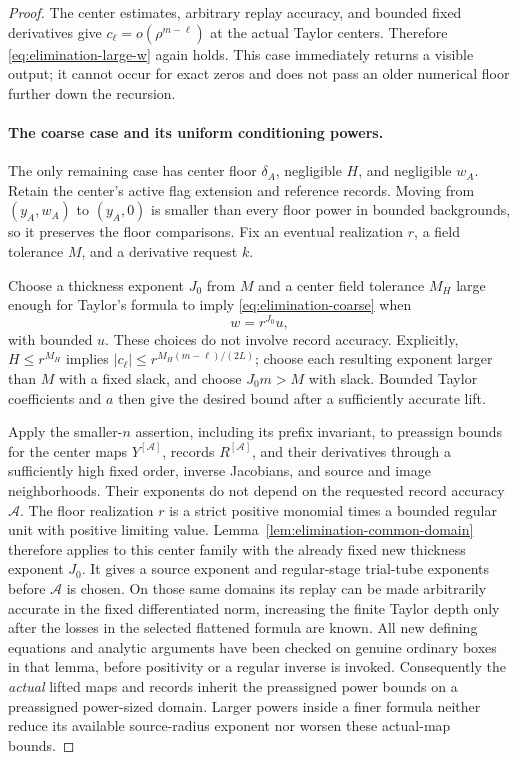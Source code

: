 \begin{proof}
The center estimates, arbitrary replay accuracy, and bounded fixed
derivatives give $c_\ell=o(\rho^{m-\ell})$ at the actual Taylor
centers.  Therefore \eqref{eq:elimination-large-w} again holds.
This case immediately returns a visible output; it cannot occur for
exact zeros and does not pass an older numerical floor further down
the recursion.

\paragraph{The coarse case and its uniform conditioning powers.}
The only remaining case has center floor $\delta_A$, negligible $H$,
and negligible $w_A$.  Retain the center's active flag extension and
reference records.  Moving from $(y_A,w_A)$ to $(y_A,0)$ is smaller
than every floor power in bounded backgrounds, so it preserves the
floor comparisons.  Fix an eventual realization $r$, a field
tolerance $M$, and a derivative request $k$.

Choose a thickness exponent $J_0$ from $M$ and a center field
tolerance $M_H$ large enough for Taylor's formula to imply
\eqref{eq:elimination-coarse} when
\begin{equation}\label{eq:elimination-thickness}
 w=r^{J_0}u,
\end{equation}
with bounded $u$.  These choices do not involve record accuracy.
Explicitly, $H\le r^{M_H}$ implies
$|c_\ell|\le r^{M_H(m-\ell)/(2L)}$; choose each resulting
exponent larger than $M$ with a fixed slack, and choose $J_0m>M$
with slack.  Bounded Taylor coefficients and $a$ then give the
desired bound after a sufficiently accurate lift.

Apply the smaller-$n$ assertion, including its prefix invariant,
to preassign bounds for the center maps $Y^{[\mathcal A]}$, records $R^{[\mathcal A]}$, and
their derivatives through a sufficiently high fixed order, inverse
Jacobians, and source and image neighborhoods.  Their exponents do
not depend on the requested record accuracy $\mathcal A$.
The floor realization $r$ is a strict positive monomial times a bounded
regular unit with positive limiting value.  Lemma~\ref{lem:elimination-common-domain}
therefore applies to this center family with the already fixed new
thickness exponent $J_0$.
It gives a source exponent and regular-stage trial-tube exponents
before $\mathcal A$ is chosen.  On those same domains its replay can be
made arbitrarily accurate in the fixed differentiated norm,
increasing the finite Taylor depth only after the losses in the
selected flattened formula are known.  All new defining equations
and analytic arguments have been checked on genuine ordinary boxes
in that lemma, before positivity or a regular inverse is invoked.
Consequently the \emph{actual} lifted maps and records inherit the
preassigned power bounds on a preassigned power-sized domain.
Larger powers inside a finer formula neither reduce its available
source-radius exponent nor worsen these actual-map bounds.


\end{proof}
